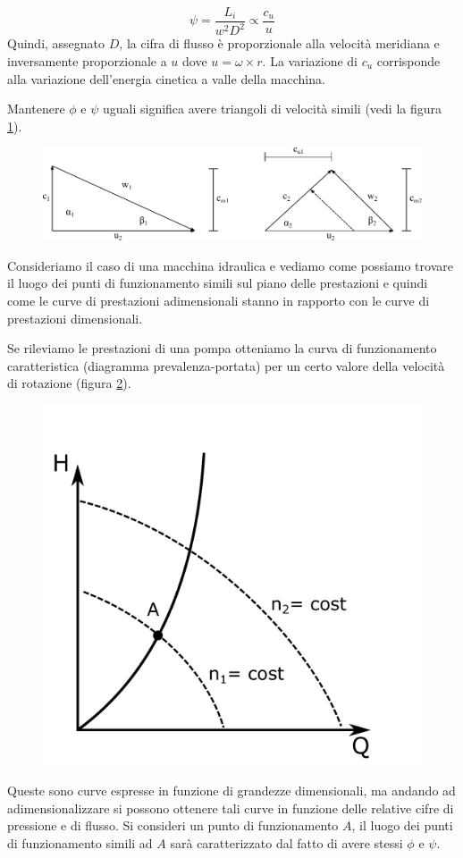 \begin{equation}
\psi = \frac{L_i}{w^2 D^2} \propto \frac{c_u}{u}
\end{equation}
Quindi, assegnato $D$, la cifra di flusso è proporzionale alla velocità meridiana e inversamente proporzionale a $u$ dove $u= \omega \times r$. La variazione di $c_u$ corrisponde alla variazione dell'energia cinetica a valle della macchina. 

Mantenere $\phi$ e $\psi$ uguali significa avere triangoli di velocità simili (vedi la figura \ref{fig:tria}).
\begin{figure}
\centering
  \includegraphics[width=.8\textwidth]{fig/triang.pdf}
\caption{}
\label{fig:tria}
\end{figure}
Consideriamo il caso di una macchina idraulica e vediamo come possiamo trovare il luogo dei punti di funzionamento simili sul piano delle prestazioni e quindi come le curve di prestazioni adimensionali stanno in rapporto con le curve di prestazioni dimensionali.

Se rileviamo le prestazioni di una pompa otteniamo la curva di funzionamento caratteristica (diagramma prevalenza-portata) per un certo valore della velocità di rotazione (figura \ref{fig:hq}).
\begin{figure}[h!]
\centering
  \includegraphics[width=.3\textwidth]{fig/hq.pdf}
\caption{}
\label{fig:hq}
\end{figure}
Queste sono curve espresse in funzione di grandezze dimensionali, ma andando ad adimensionalizzare si possono ottenere tali curve in funzione delle relative cifre di pressione e di flusso.  Si consideri un punto di funzionamento $A$, il luogo dei punti di funzionamento simili ad $A$ sarà caratterizzato dal fatto di avere stessi $\phi$ e $\psi$.

